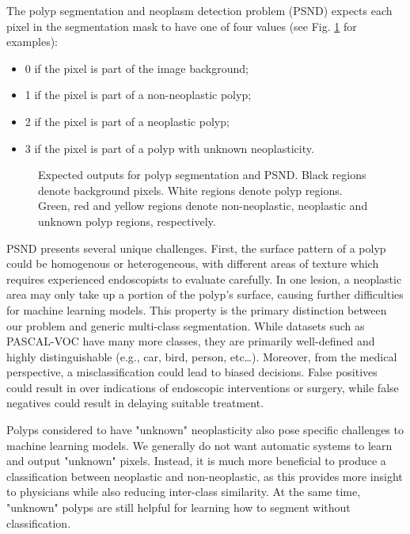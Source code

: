 \documentclass[runningheads]{llncs}
\begin{document}
	The polyp segmentation and neoplasm detection problem (PSND) expects each pixel in the segmentation mask to have one of four values (see Fig. \ref{fig:example} for examples):
	\begin{itemize}
		\item 0 if the pixel is part of the image background;
		\item 1 if the pixel is part of a non-neoplastic polyp;
		\item 2 if the pixel is part of a neoplastic polyp;
		\item 3 if the pixel is part of a polyp with unknown neoplasticity.
	\end{itemize}

	\begin{figure}[tbh]
		\centering
		\caption{Expected outputs for polyp segmentation and PSND. Black regions denote background pixels. White regions denote polyp regions. Green, red and yellow regions denote non-neoplastic, neoplastic and unknown polyp regions, respectively.}
		\label{fig:example}
	\end{figure}

	PSND presents several unique challenges. First, the surface pattern of a polyp could be homogenous or heterogeneous, with different areas of texture which requires experienced endoscopists to evaluate carefully. In one lesion, a neoplastic area may only take up a portion of the polyp's surface, causing further difficulties for machine learning models. This property is the primary distinction between our problem and generic multi-class segmentation. While datasets such as PASCAL-VOC have many more classes, they are primarily well-defined and highly distinguishable (e.g., car, bird, person, etc\dots). Moreover, from the medical perspective, a misclassification could lead to biased decisions. False positives could result in over indications of endoscopic interventions or surgery, while false negatives could result in delaying suitable treatment.

	Polyps considered to have "unknown" neoplasticity also pose specific challenges to machine learning models. We generally do not want automatic systems to learn and output "unknown" pixels. Instead, it is much more beneficial to produce a classification between neoplastic and non-neoplastic, as this provides more insight to physicians while also reducing inter-class similarity. At the same time, "unknown" polyps are still helpful for learning how to segment without classification.
\end{document}
